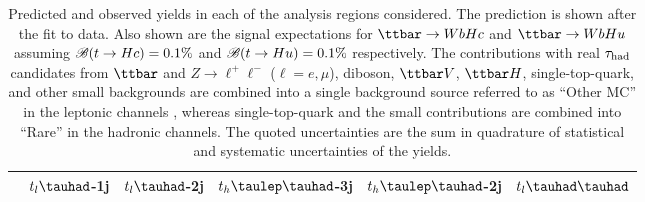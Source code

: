 \begin{table}[htbp]
\caption{
Predicted and observed yields in each of the analysis regions considered. The prediction is shown after the fit to data. Also shown are the signal expectations for $\Hc$ and $\Hu$ assuming $\mathscr{B}(t\to Hc)=0.1\%$ and $\mathscr{B}(t\to Hu)=0.1\%$ respectively. The contributions with real $\tau_{\mathrm{had}}$ candidates from $\ttbar$ and  $Z\to \ell^+\ell^-$ ($\ell = e, \mu$), diboson, $\ttbar V$, $\ttbar H$, single-top-quark, and other small backgrounds are combined into
a single background source referred to as ``Other MC'' in the leptonic channels , whereas single-top-quark and the small contributions are combined into ``Rare'' in the hadronic channels. The quoted uncertainties are the sum in quadrature of statistical and systematic uncertainties of the yields.}
\small
\centering

\begin{tabular}{cccccc} \toprule\toprule
 & $t_l\tauhad$-1j & $t_l\tauhad$-2j & $t_h\tlhad$-3j &$t_h\tlhad$-2j  & $t_l\thadhad$ \\\hline 


\end{tabular}
\end{table}
